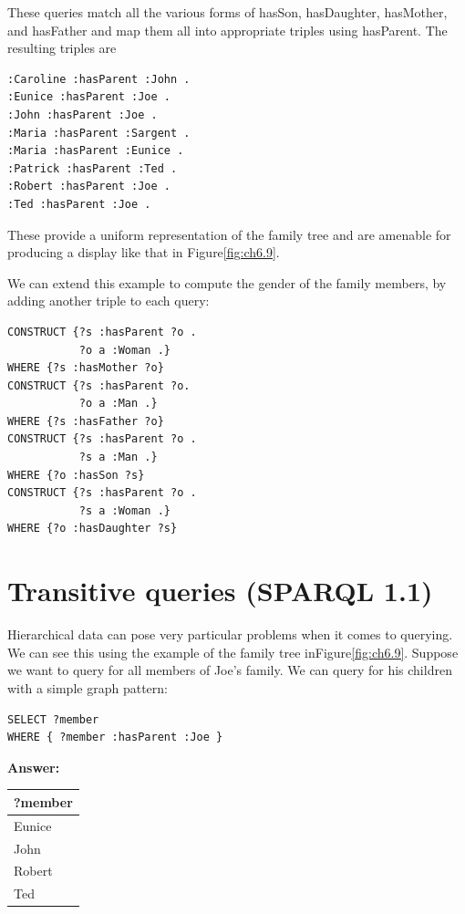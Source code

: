 \begin{challenge}
These queries match all the various forms of hasSon, hasDaughter,
hasMother, and hasFather and map them all into appropriate triples using
hasParent. The resulting triples are


\begin{lstlisting}
:Caroline :hasParent :John .
:Eunice :hasParent :Joe .
:John :hasParent :Joe .
:Maria :hasParent :Sargent .
:Maria :hasParent :Eunice .
:Patrick :hasParent :Ted .
:Robert :hasParent :Joe .
:Ted :hasParent :Joe .
\end{lstlisting}

These provide a uniform representation of the family tree and are
amenable for producing a display like that in 
Figure\ref{fig:ch6.9}.

We can extend this example to compute the gender of the family members,
by adding another triple to each query:

\begin{lstlisting}
CONSTRUCT {?s :hasParent ?o .
           ?o a :Woman .}
WHERE {?s :hasMother ?o} 
CONSTRUCT {?s :hasParent ?o.
           ?o a :Man .} 
WHERE {?s :hasFather ?o} 
CONSTRUCT {?s :hasParent ?o .
           ?s a :Man .} 
WHERE {?o :hasSon ?s} 
CONSTRUCT {?s :hasParent ?o .
           ?s a :Woman .}
WHERE {?o :hasDaughter ?s}
\end{lstlisting}
\end{challenge}

\section{Transitive queries (SPARQL 1.1)}

Hierarchical data can pose very particular problems when it comes to
querying. We can see this using the example of the family tree inFigure\ref{fig:ch6.9}.
Suppose we want to query for all members of Joe's family. We can
query for his children with a simple graph pattern:


\begin{lstlisting}
SELECT ?member
WHERE { ?member :hasParent :Joe }
\end{lstlisting}

\textbf{\textbf{Answer:}}

\begin{tabular}{|l|}
\hline
?member\\
\hline
Eunice\\
John\\
Robert\\
Ted\\
\hline
\end{tabular}

